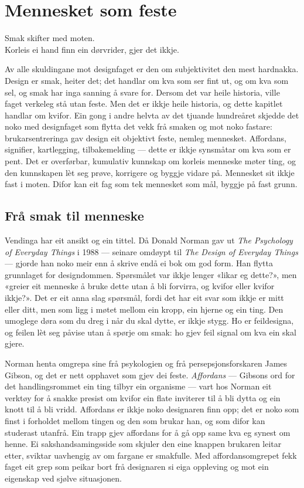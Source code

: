 \chapter{Mennesket som feste}

\begin{motto}
Smak skifter med moten.\\ Korleis ei hand finn ein dørvrider, gjer det ikkje.
\end{motto}

Av alle skuldingane mot designfaget er den om subjektivitet den mest hardnakka. Design er smak, heiter det; det handlar om kva som ser fint ut, og om kva som sel, og smak har inga sanning å svare for. Dersom det var heile historia, ville faget verkeleg stå utan feste. Men det er ikkje heile historia, og dette kapitlet handlar om kvifor. Ein gong i andre helvta av det tjuande hundreåret skjedde det noko med designfaget som flytta det vekk frå smaken og mot noko fastare: brukarsentreringa gav design eit objektivt feste, nemleg mennesket. Affordans, signifier, kartlegging, tilbakemelding — dette er ikkje synsmåtar om kva som er pent. Det er overførbar, kumulativ kunnskap om korleis menneske møter ting, og den kunnskapen lèt seg prøve, korrigere og byggje vidare på. Mennesket sit ikkje fast i moten. Difor kan eit fag som tek mennesket som mål, byggje på fast grunn.

\section{Frå smak til menneske}

Vendinga har eit ansikt og ein tittel. Då Donald Norman gav ut \emph{The Psychology of Everyday Things} i 1988 — seinare omdøypt til \emph{The Design of Everyday Things} \autocite{norman2013} — gjorde han noko meir enn å skrive endå ei bok om god form. Han flytta grunnlaget for designdommen. Spørsmålet var ikkje lenger «likar eg dette?», men «greier eit menneske å bruke dette utan å bli forvirra, og kvifor eller kvifor ikkje?». Det er eit anna slag spørsmål, fordi det har eit svar som ikkje er mitt eller ditt, men som ligg i møtet mellom ein kropp, ein hjerne og ein ting. Den umoglege døra som du dreg i når du skal dytte, er ikkje stygg. Ho er feildesigna, og feilen lèt seg påvise utan å spørje om smak: ho gjev feil signal om kva ein skal gjere.

Norman henta omgrepa sine frå psykologien og frå persepsjonsforskaren James Gibson, og det er nett opphavet som gjev dei feste. \emph{Affordans} — Gibsons ord for det handlingsrommet ein ting tilbyr ein organisme — vart hos Norman eit verktøy for å snakke presist om kvifor ein flate inviterer til å bli dytta og ein knott til å bli vridd. Affordans er ikkje noko designaren finn opp; det er noko som finst i forholdet mellom tingen og den som brukar han, og som difor kan studerast utanfrå. Ein trapp gjev affordans for å gå opp same kva eg synest om henne. Ei sakshandsamingsside som skjuler den eine knappen brukaren leitar etter, sviktar uavhengig av om fargane er smakfulle. Med affordansomgrepet fekk faget eit grep som peikar bort frå designaren si eiga oppleving og mot ein eigenskap ved sjølve situasjonen.

